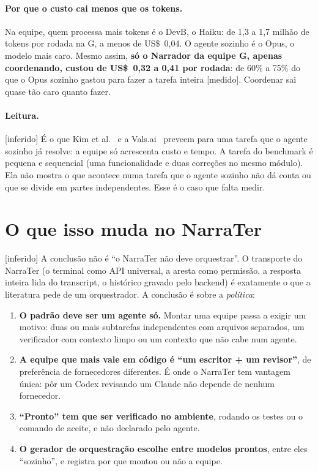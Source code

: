 \documentclass[11pt,a4paper]{article}
\newcommand{\rot}[1]{\textsf{\footnotesize[#1]}}
\begin{document}
\paragraph{Por que o custo cai menos que os tokens.} Na equipe, quem processa mais tokens é o DevB,
o Haiku: de 1,3 a 1,7 milhão de tokens por rodada na G, a menos de US\$~0,04. O agente sozinho é o
Opus, o modelo mais caro. Mesmo assim, \textbf{só o Narrador da equipe G, apenas coordenando, custou
de US\$~0,32 a 0,41 por rodada}: de 60\% a 75\% do que o Opus sozinho gastou para fazer a tarefa
inteira \rot{medido}. Coordenar sai quase tão caro quanto fazer.

\paragraph{Leitura.} \rot{inferido} É o que Kim et al.~\cite{kim2025} e a Vals.ai~\cite{vals2026}
preveem para uma tarefa que o agente sozinho já resolve: a equipe só acrescenta custo e tempo. A tarefa
do benchmark é pequena e sequencial (uma funcionalidade e duas correções no mesmo módulo). Ela não
mostra o que acontece numa tarefa que o agente sozinho não dá conta ou que se divide em partes
independentes. Esse é o caso que falta medir.

\section{O que isso muda no NarraTer}

\rot{inferido} A conclusão não é ``o NarraTer não deve orquestrar''. O transporte do NarraTer
(o terminal como API universal, a aresta como permissão, a resposta inteira lida do transcript, o
histórico gravado pelo backend) é exatamente o que a literatura pede de um orquestrador. A conclusão é
sobre a \emph{política}:

\begin{enumerate}
  \item \textbf{O padrão deve ser um agente só.} Montar uma equipe passa a exigir um motivo: duas ou
    mais subtarefas independentes com arquivos separados, um verificador com contexto limpo ou um
    contexto que não cabe num agente.
  \item \textbf{A equipe que mais vale em código é ``um escritor + um revisor''}, de preferência de
    fornecedores diferentes. É onde o NarraTer tem vantagem única: pôr um Codex revisando um Claude
    não depende de nenhum fornecedor.
  \item \textbf{``Pronto'' tem que ser verificado no ambiente}, rodando os testes ou o comando de
    aceite, e não declarado pelo agente.
  \item \textbf{O gerador de orquestração escolhe entre modelos prontos}, entre eles ``sozinho'', e
    registra por que montou ou não a equipe.
\end{enumerate}
\end{document}

